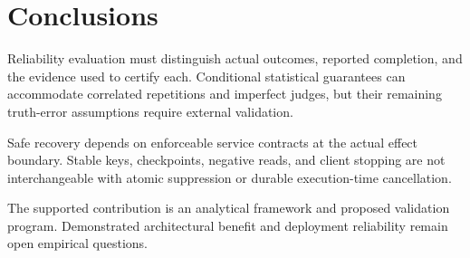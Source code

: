 \documentclass[11pt]{article}
\begin{document}
\section{Conclusions}
Reliability evaluation must distinguish actual outcomes, reported completion, and the evidence used to certify each. Conditional statistical guarantees can accommodate correlated repetitions and imperfect judges, but their remaining truth-error assumptions require external validation.

Safe recovery depends on enforceable service contracts at the actual effect boundary. Stable keys, checkpoints, negative reads, and client stopping are not interchangeable with atomic suppression or durable execution-time cancellation.

The supported contribution is an analytical framework and proposed validation program. Demonstrated architectural benefit and deployment reliability remain open empirical questions.

\appendix
\end{document}
